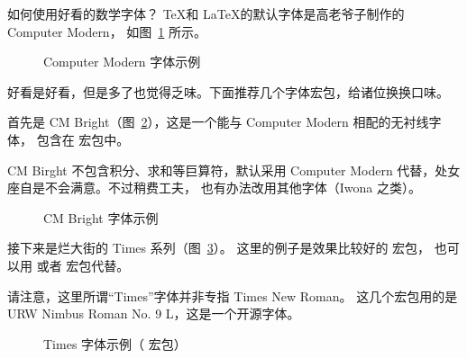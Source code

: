 \begin{myQA}{如何使用好看的数学字体？}
\TeX 和 \LaTeX 的默认字体是高老爷子制作的 Computer Modern，
如图~\ref{Fig:cm_1} 所示。

\begin{figure}[h]
	\centering
	\caption{Computer Modern 字体示例}
	\label{Fig:cm_1}
\end{figure}

好看是好看，但是多了也觉得乏味。下面推荐几个字体宏包，给诸位换换口味。

首先是 CM Bright（图~\ref{Fig:cmbright}），这是一个能与
Computer Modern 相配的无衬线字体，
包含在  宏包中。

CM Birght 不包含积分、求和等巨算符，默认采用
Computer Modern 代替，处女座自是不会满意。不过稍费工夫，
也有办法改用其他字体（Iwona 之类）。

\begin{figure}[h]
	\centering
	\caption{CM Bright 字体示例}
	\label{Fig:cmbright}
\end{figure}

接下来是烂大街的 Times 系列（图~\ref{Fig:txfonts}）。
这里的例子是效果比较好的   宏包，
也可以用   或者
  宏包代替。

请注意，这里所谓“Times”字体并非专指 Times New Roman。
这几个宏包用的是 URW Nimbus Roman No. 9 L，这是一个开源字体。

\begin{figure}[h]
	\centering
	\caption{Times 字体示例（ 宏包）}
	\label{Fig:txfonts}
\end{figure}


\end{myQA}

